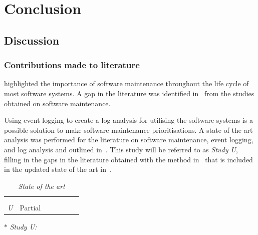 \chapter{Conclusion}
\label{chap:4}

\section{Discussion}

\subsection{Contributions made to literature}
 highlighted the importance of software maintenance throughout the life cycle of most software systems. A gap in the literature was identified in~ from the studies obtained on software maintenance. \par Using event logging to create a log analysis for utilising the software systems is a possible solution to make software maintenance prioritisations. A state of the art analysis was performed for the literature on software maintenance, event logging, and log analysis and outlined in~. This study will be referred to as \textit{Study U}, filling in the gaps in the literature obtained with the method in~ that is included in the updated state of the art in~.

\begin{table}[!htb]
	\centering
	\caption[State of the art]
	{\textit{State of the art}}
	\label{tbl:ch4_stateOfTheArt}
	\begin{threeparttable}
		\begin{tabularx}{\textwidth}{cYYYYYY}
			\toprule
			 &  &  &  \\ 
			 \cmidrule(lr){2-4} \cmidrule(lr){5-6} \cmidrule(lr){7-7}
			 & \RaggedRight {} & \RaggedRight {} & \RaggedRight {} &  &  & \RaggedRight {} \\ 		
			\midrule
				\sotaCore
				\textit{U}\tnote{$\ast$} & Partial & \cmark & \cmark & \cmark & \cmark & \cmark \\
			\bottomrule
		\end{tabularx}
		\begin{tablenotes}\footnotesize
			\item[$\ast$] \textit{Study U:~\ThesisTitle}
		\end{tablenotes}
	\end{threeparttable}
\end{table}

